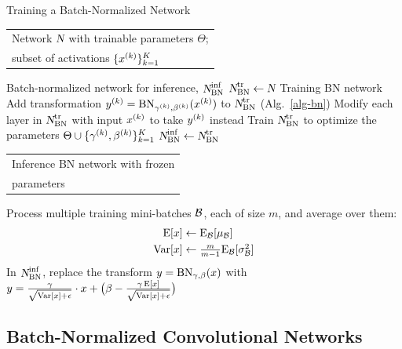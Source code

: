 \documentclass[twocolumn]{article}
\begin{document}
\begin{algorithm}
\caption{Training a Batch-Normalized Network}
\label{alg-train}
\begin{algorithmic}[1]
\REQUIRE 
\begin{tabular}[t]{@{}l}
Network $\norig$ with trainable  parameters $\Theta$;\\
 subset of activations $\{x^\kk\}_{k=1}^K$
 \end{tabular}
\ENSURE  Batch-normalized network  for inference, $\ninf$
\STATE $\ntrain\leftarrow \norig$ \quad \COMMENT Training BN network
\STATE 
Add transformation $y^\kk = \BN{x^\kk}{\gamma^\kk,\beta^\kk}$  to $\ntrain$ (Alg.~\ref{alg-bn})
\STATE
Modify each layer in $\ntrain$ with input $x^\kk$ to take $y^\kk$ instead
\ENDFOR
\STATE
Train $\ntrain$ to optimize the parameters $\Theta\cup 
\{\gamma^\kk, \beta^\kk\}_{k=1}^K$
\STATE \vspace{.03in}
$\ninf\leftarrow\ntrain$\quad \begin{tabular}[t]{@{}l}\COMMENT Inference BN network with frozen\\ \COMMENT parameters \end{tabular}
\STATE {}
\STATE Process multiple training mini-batches  $\setB$, each of size $m$, and average over them:
\vspace{-.1in}
\begin{align*}
\E[x] &\leftarrow \E_\setB[\mu_\setB]\\
 \Var[x] &\leftarrow \textstyle \frac{m}{m-1}\E_\setB[\sigma_\setB^2]
 \end{align*}
\STATE 
\vspace{-.1in}
In $\ninf$, replace the transform $y=\BN{x}{\gamma,\beta}$ with\, $y = \frac{\gamma}{\sqrt{\Var[x]+\epsilon}}\cdot x + \big(\beta - \frac{\gamma\,\E[x]}{\sqrt{\Var[x]+\epsilon}}\big)$
\ENDFOR
\end{algorithmic}
\end{algorithm}

\subsection{Batch-Normalized Convolutional Networks}
\label{sec-conv}
\end{document}
